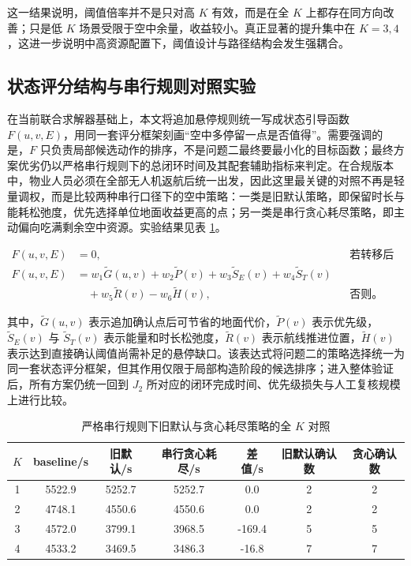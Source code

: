 \documentclass[12pt]{article}
\begin{document}
这一结果说明，阈值倍率并不是只对高 $K$ 有效，而是在全 $K$ 上都存在同方向改善；只是低 $K$ 场景受限于空中余量，收益较小。真正显著的提升集中在 $K=3,4$，这进一步说明中高资源配置下，阈值设计与路径结构会发生强耦合。

\subsection{状态评分结构与串行规则对照实验}
在当前联合求解器基础上，本文将追加悬停规则统一写成状态引导函数 $F(u,v,E)$，用同一套评分框架刻画“空中多停留一点是否值得”。需要强调的是，$F$ 只负责局部候选动作的排序，不是问题二最终要最小化的目标函数；最终方案优劣仍以严格串行规则下的总闭环时间及其配套辅助指标来判定。在合规版本中，物业人员必须在全部无人机返航后统一出发，因此这里最关键的对照不再是轻量调权，而是比较两种串行口径下的空中策略：一类是旧默认策略，即保留时长与能耗松弛度，优先选择单位地面收益更高的点；另一类是串行贪心耗尽策略，即主动偏向吃满剩余空中资源。实验结果见表 \ref{tab:problem2-f-light-fullk}。

\begin{equation}
\begin{aligned}
F(u,v,E) &= 0, && \text{若转移后不可返航；} \\
F(u,v,E) &= w_1 \tilde{G}(u,v)+w_2 \tilde{P}(v)+w_3 \tilde{S}_E(v)
           + w_4 \tilde{S}_T(v) \\
          &\quad + w_5 \tilde{R}(v)-w_6 \tilde{H}(v), && \text{否则。}
\end{aligned}
\end{equation}

其中，$\tilde{G}(u,v)$ 表示追加确认点后可节省的地面代价，$\tilde{P}(v)$ 表示优先级，$\tilde{S}_E(v)$ 与 $\tilde{S}_T(v)$ 表示能量和时长松弛度，$\tilde{R}(v)$ 表示航线推进位置，$\tilde{H}(v)$ 表示达到直接确认阈值尚需补足的悬停缺口。该表达式将问题二的策略选择统一为同一套状态评分框架，但其作用仅限于局部构造阶段的候选排序；进入整体验证后，所有方案仍统一回到 $J_2$ 所对应的闭环完成时间、优先级损失与人工复核规模上进行比较。

\begin{table}[H]
\centering
\caption{严格串行规则下旧默认与贪心耗尽策略的全 $K$ 对照}
\label{tab:problem2-f-light-fullk}
\begin{tabular}{ccccccc}
\toprule
$K$ & baseline/s & 旧默认/s & 串行贪心耗尽/s & 差值/s & 旧默认确认数 & 贪心确认数 \\
\midrule
1 & 5522.9 & 5252.7 & 5252.7 & 0.0 & 2 & 2 \\
2 & 4748.1 & 4550.6 & 4550.6 & 0.0 & 2 & 2 \\
3 & 4572.0 & 3799.1 & 3968.5 & -169.4 & 5 & 5 \\
4 & 4533.2 & 3469.5 & 3486.3 & -16.8 & 7 & 7 \\
\bottomrule
\end{tabular}
\end{table}
\end{document}
